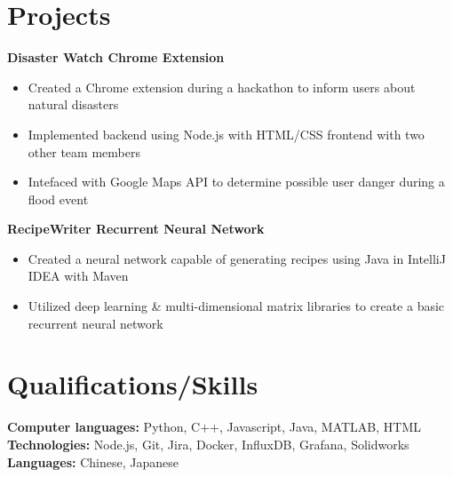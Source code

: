 \documentclass[letterpaper,11pt]{article}
\begin{document}
\section{Projects}
\textbf{Disaster Watch Chrome Extension}\\
\begin{itemize}[noitemsep, topsep=0pt, leftmargin=0.7cm]
  \item Created a Chrome extension during a hackathon to inform users about natural disasters
  \item Implemented backend using Node.js with HTML/CSS frontend with two other team members
  \item Intefaced with Google Maps API to determine possible user danger during a flood event
\end{itemize}
\textbf{RecipeWriter Recurrent Neural Network}\\
\begin{itemize}[noitemsep, topsep=0pt, leftmargin=0.7cm]
  \item Created a neural network capable of generating recipes using Java in IntelliJ IDEA with Maven
  \item Utilized deep learning \& multi-dimensional matrix libraries to create a basic recurrent neural network
\end{itemize}
\section{Qualifications/Skills}
\textbf{Computer languages:} Python, C++, Javascript, Java, MATLAB, HTML\\
\textbf{Technologies:} Node.js, Git, Jira, Docker, InfluxDB, Grafana, Solidworks\\
\textbf{Languages:} Chinese, Japanese\\
\end{document}
